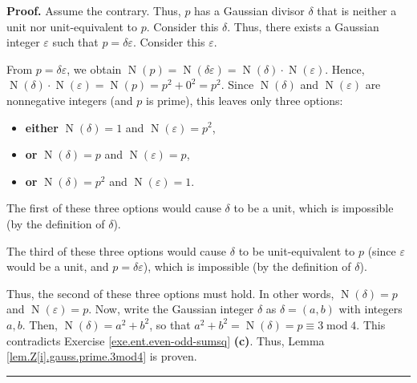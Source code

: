 \documentclass[numbers=enddot,12pt,final,onecolumn,notitlepage]{scrartcl}%
\numberwithin{exer}{subsection}
\theoremstyle{definition}
\newenvironment{proof}[1][Proof]{\noindent\textbf{#1.} }{\ \rule{0.5em}{0.5em}}
\begin{document}
\begin{proof}
Assume the contrary. Thus, $p$ has a Gaussian divisor $\delta$ that is neither
a unit nor unit-equivalent to $p$. Consider this $\delta$. Thus, there exists
a Gaussian integer $\varepsilon$ such that $p=\delta\varepsilon$. Consider
this $\varepsilon$.

From $p=\delta\varepsilon$, we obtain $\operatorname*{N}\left(  p\right)
=\operatorname*{N}\left(  \delta\varepsilon\right)  =\operatorname*{N}\left(
\delta\right)  \cdot\operatorname*{N}\left(  \varepsilon\right)  $. Hence,
$\operatorname*{N}\left(  \delta\right)  \cdot\operatorname*{N}\left(
\varepsilon\right)  =\operatorname*{N}\left(  p\right)  =p^{2}+0^{2}=p^{2}$.
Since $\operatorname*{N}\left(  \delta\right)  $ and $\operatorname*{N}\left(
\varepsilon\right)  $ are nonnegative integers (and $p$ is prime), this leaves
only three options:

\begin{itemize}
\item \textbf{either} $\operatorname*{N}\left(  \delta\right)  =1$ and
$\operatorname*{N}\left(  \varepsilon\right)  =p^{2}$,

\item \textbf{or }$\operatorname*{N}\left(  \delta\right)  =p$ and
$\operatorname*{N}\left(  \varepsilon\right)  =p$,

\item \textbf{or }$\operatorname*{N}\left(  \delta\right)  =p^{2}$ and
$\operatorname*{N}\left(  \varepsilon\right)  =1$.
\end{itemize}

The first of these three options would cause $\delta$ to be a unit, which is
impossible (by the definition of $\delta$).

The third of these three options would cause $\delta$ to be unit-equivalent to
$p$ (since $\varepsilon$ would be a unit, and $p=\delta\varepsilon$), which is
impossible (by the definition of $\delta$).

Thus, the second of these three options must hold. In other words,
$\operatorname*{N}\left(  \delta\right)  =p$ and $\operatorname*{N}\left(
\varepsilon\right)  =p$. Now, write the Gaussian integer $\delta$ as
$\delta=\left(  a,b\right)  $ with integers $a,b$. Then, $\operatorname*{N}%
\left(  \delta\right)  =a^{2}+b^{2}$, so that $a^{2}+b^{2}=\operatorname*{N}%
\left(  \delta\right)  =p\equiv3\operatorname{mod}4$. This contradicts
Exercise \ref{exe.ent.even-odd-sumsq} \textbf{(c)}. Thus, Lemma
\ref{lem.Z[i].gauss.prime.3mod4} is proven.
\end{proof}
\end{document}
